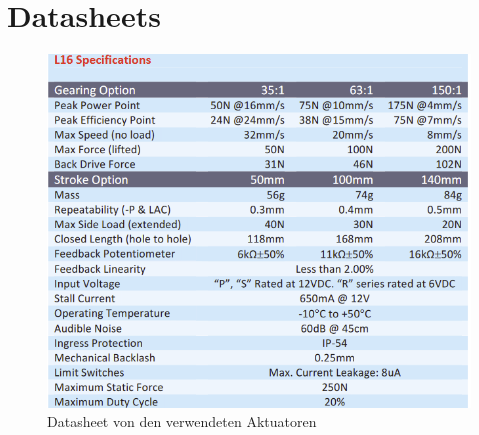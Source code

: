 \chapter{Datasheets}
\begin{figure}
    \centering
    \includegraphics[width=1\linewidth]{assets/L16_Actuonix.png}
    \caption{Datasheet von den verwendeten Aktuatoren}
    \label{fig:enter-label}
\end{figure}